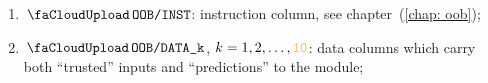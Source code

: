 \begin{enumerate}[resume]
	\item $\miscOobInst$:
		\oobMod{} instruction column, see chapter~(\ref{chap: oob});
	\item $\miscOobDataCol{k}$, $k = 1, 2, \dots, \numberOfOobDataColumns$:
		data columns which carry both ``trusted'' inputs and ``predictions'' to the \oobMod{} module;
\end{enumerate}
